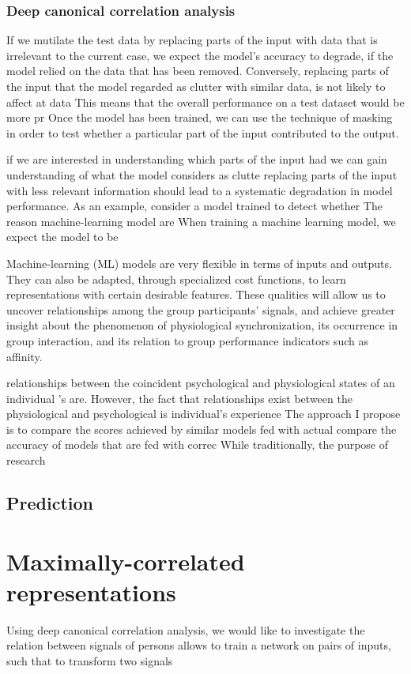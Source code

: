 \documentclass[a4paper, 11pt]{article}      %
\begin{document}
\subsubsection{Deep canonical correlation analysis}

If we mutilate the test data by replacing parts of the input with data that is irrelevant to the current case, we expect the model's accuracy to degrade, if the model relied on the data that has been removed. Conversely, replacing parts of the input that the model regarded as clutter with similar data, is not likely to affect 
at data  This means that the overall performance on a test dataset would be more pr Once the model has been trained, we can use the technique of masking in order to test whether a particular part of the input contributed to the output.

if we are interested in understanding which parts of the input had  we can gain understanding of what the model considers as clutte replacing parts of the input with less relevant information should lead to a systematic degradation in model performance. As an example, consider a model trained to detect whether 
The reason machine-learning model are 
When training a machine learning model, we expect the model to be 

Machine-learning (ML) models are very flexible in terms of inputs and outputs. They can also be adapted, through specialized cost functions, to learn representations with certain desirable features. These qualities will allow us to uncover relationships among the group participants' signals, and achieve greater insight about the phenomenon of physiological synchronization, its occurrence in group interaction, and its relation to group performance indicators such as affinity.



relationships between the coincident psychological and physiological states of an individual
's are. However, the 
fact that relationships exist between the physiological and psychological is  
individual's experience 
The approach I propose is to compare the scores achieved by similar models fed with actual 
compare the accuracy of models that are fed with correc
While traditionally, the purpose of research 

\subsection{Prediction }

\section{Maximally-correlated representations}
Using deep canonical correlation analysis, we would like to investigate the relation between signals of persons 
allows to train a network on pairs of inputs, such that to transform two signals 
\end{document}
